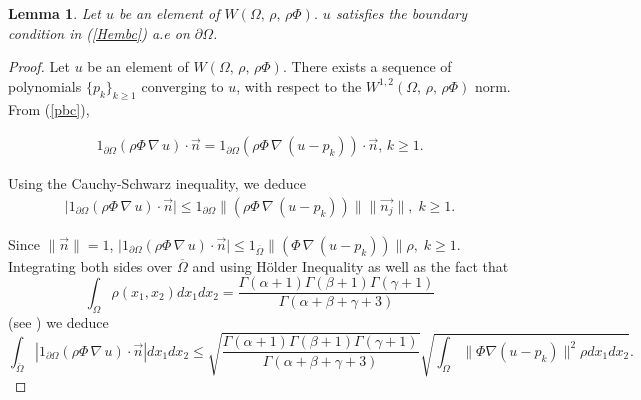 \documentclass[11pt]{article}
\newtheorem{lemma}[theorem]{Lemma}
\begin{document}
	\begin{lemma}\label{Lemmabc} Let $u$ be an element of $W(\Omega,\,\rho ,\,\rho \Phi).$  $u$ satisfies the boundary condition in (\ref{Hembc}) a.e on $\partial\Omega$.
	\end{lemma}
	\begin{proof}
		Let  $u$ be an element of $W(\Omega,\,\rho ,\,\rho \Phi).$  There exists a sequence of polynomials {$\{p_k\}_{k \geq 1}$} converging to $u$, with respect to the $W^{1,2}(\Omega,\,\rho ,\,\rho \Phi)$ norm. From (\ref{pbc}), 
		
		\begin{align*}
			1_{\partial\Omega}\left(\rho \Phi\,\nabla\,u\right)\cdot\overrightarrow{n}=1_{\partial\Omega}\left(\rho \Phi\,\nabla\,(u-p_k)\right)\cdot\overrightarrow{n},\,k\geq 1.
		\end{align*}
		
		Using the Cauchy-Schwarz inequality, we deduce
		\begin{align*}
			\lvert1_{\partial\Omega}\left(\rho \Phi\,\nabla\,u\right)\cdot\overrightarrow{n}\rvert\leq1_{\partial\Omega}\|\left(\rho \Phi\,\nabla\,(u-p_k)\right)\| \|\overrightarrow{n_j}\|,\;k\geq 1.
		\end{align*}
		
		Since $\|\overrightarrow{n}\|=1$,	$\lvert1_{\partial\Omega}\left(\rho \Phi\,\nabla\,u\right)\cdot\overrightarrow{n}\rvert\leq 1_{\overline{\Omega}}\|\left( \Phi\,\nabla\,(u-p_k)\right)\|\rho ,\;k\geq 1.$	
		Integrating both sides over $\overline{\Omega}$ and using  {H\"older} Inequality as well as the fact that 
			$$\int_{\Omega}\rho(x_1,x_2)dx_1dx_2=\frac{\Gamma(\alpha+1)\Gamma(\beta+1)\Gamma(\gamma+1)}{\Gamma(\alpha+\beta+\gamma+3)}$$ (see \cite[p.80]{Yuan}) we deduce
		\begin{equation}\label{e11}
			\int_{\overline{\Omega}}\left |1_{\partial\Omega}\left(\rho  \Phi\,\nabla\,u\right)\cdot\overrightarrow{n}\right |dx_1dx_2\leq\sqrt{\frac{\Gamma(\alpha+1)\Gamma(\beta+1)\Gamma(\gamma+1)}{\Gamma(\alpha+\beta+\gamma+3)}} \sqrt{\int_{\Omega}\|\Phi \nabla (u-p_k)\|^2\rho dx_1dx_2}.
		\end{equation}
		

\end{proof}
\end{document}
